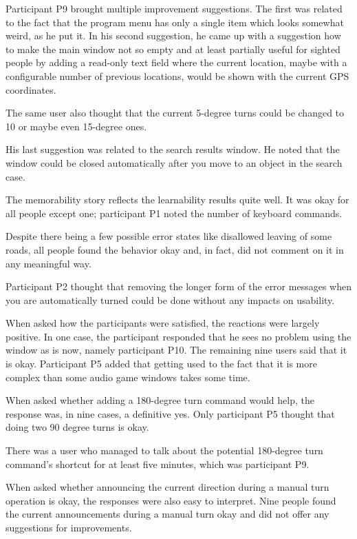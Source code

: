 \documentclass[nolof,digital]{fithesis3}
\begin{document}
Participant P9 brought multiple improvement suggestions. The first was related to the fact that the program menu has only a single item which looks somewhat weird, as he put it. In his second suggestion, he came up with a suggestion how to make the main window not so empty and at least partially useful for sighted people by adding a read-only text field where the current location, maybe with a configurable number of previous locations, would be shown with the current GPS coordinates.

The same user also thought that the current 5-degree turns could be changed to 10 or maybe even 15-degree ones.

His last suggestion was related to the search results window. He noted that the window could be closed automatically after you move to an object in the search case.

The memorability story reflects the learnability results quite well. It was okay for all people except one; participant P1 noted the number of keyboard commands.

Despite there being a few possible error states like disallowed leaving of some roads, all people found the behavior okay and, in fact, did not comment on it in any meaningful way.

Participant P2 thought that removing the longer form of the error messages when you are automatically turned could be done without any impacts on usability.

When asked how the participants were satisfied, the reactions were largely positive. In one case, the participant responded that he sees no problem using the window as is now, namely participant P10. The remaining nine users said that it is okay. Participant P5 added that getting used to the fact that it is more complex than some audio game windows takes some time.

When asked whether adding a 180-degree turn command would help, the response was, in nine cases, a definitive yes. Only participant P5 thought that doing two 90 degree turns is okay.

There was a user who managed to talk about the potential 180-degree turn command's shortcut for at least five minutes, which was participant P9.

When asked whether announcing the current direction during a manual turn operation is okay, the responses were also easy to interpret. Nine people found the current announcements during a manual turn okay and did not offer any suggestions for improvements.
\end{document}
